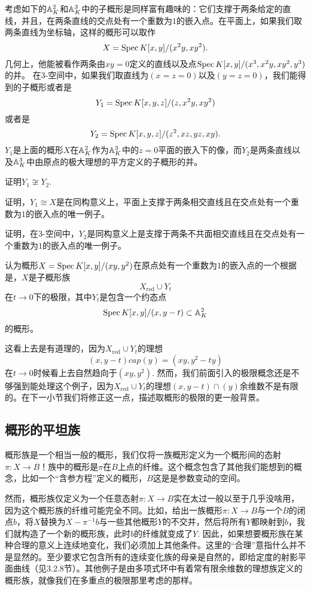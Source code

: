 考虑如下的$\mathbb{A}_K^2$和$\mathbb{A}_K^3$中的子概形是同样富有趣味的：它们支撑于两条给定的直线，并且，在两条直线的交点处有一个重数为$1$的嵌入点。在平面上，如果我们取两条直线为坐标轴，这样的概形可以取作
\[
	X=\operatorname{Spec} K[x,y]/(x^2y,xy^2).
\]
几何上，他能被看作两条由$xy=0$定义的直线以及点$\operatorname{Spec} K[x,y]/(x^3,x^2y,xy^2,y^3)$的并。 在$3$\hyp 空间中，如果我们取直线为$(x=z=0)$以及$(y=z=0)$，我们能得到的子概形或者是
\[
	Y_1=\operatorname{Spec} K[x,y,z]/(z,x^2y,xy^2)
\]
或者是
\[
	Y_2=\operatorname{Spec} K[x,y,z]/(z^2,xz,yz,xy).
\]
$Y_1$是上面的概形$X$在$\mathbb{A}_K^2$作为$\mathbb{A}_K^3$中的$z=0$平面的嵌入下的像，而$Y_2$是两条直线以及$\mathbb{A}_K^3$中由原点的极大理想的平方定义的子概形的并。

\begin{exe}
	证明$Y_1\not\cong Y_2$.
	\begin{compactenum}[(a)]
		\item 证明，$Y_1\cong X$是在同构意义上，平面上支撑于两条相交直线且在交点处有一个重数为$1$的嵌入点的唯一例子。
		\item 证明，在$3$\hyp 空间中，$Y_2$是同构意义上是支撑于两条不共面相交直线且在交点处有一个重数为$1$的嵌入点的唯一例子。
	\end{compactenum}
\end{exe}

认为概形$X=\operatorname{Spec} K[x,y]/(xy,y^2)$在原点处有一个重数为$1$的嵌入点的一个根据是，$X$是子概形族
\[
	X_{\text{red}}\cup Y_t
\]
在$t\to 0$下的极限，其中$Y_t$是包含一个约态点
\[
	\operatorname{Spec} K[x,y]/(x,y-t)\subset \mathbb{A}_K^2
\]
的概形。

这看上去是有道理的，因为$X_{\text{red}}\cup Y_t$的理想
\[
	(x,y-t)cap (y)=(xy,y^2-ty)
\]
在$t\to 0$时候看上去自然趋向于$(xy,y^2)$. 然而，我们前面引入的极限概念还是不够强到能处理这个例子，因为$X_{\text{red}}\cup Y_t$的理想$(x,y-t)\cap(y)$余维数不是有限的。在下一小节我们将修正这一点，描述取概形的极限的更一般背景。

\subsection{概形的平坦族}\label{s.2.3.4}

概形族是一个相当一般的概形，我们仅将一族概形定义为一个概形间的态射$\pi:X\to B$！族中的概形是$\pi$在$B$上点的纤维。这个概念包含了其他我们能想到的概念，比如一个“含参方程”定义的概形，$B$这是是参数变动的空间。

然而，概形族仅定义为一个任意态射$\pi:X\to B$实在太过一般以至于几乎没啥用，因为这个概形族的纤维可能完全不同。比如，给出一族概形$\pi:X\to B$与一个$B$的闭点$b$，将$X$替换为$X-\pi^{-1}b$与一些其他概形$Y$的不交并，然后将所有$Y$都映射到$b$，我们就构造了一个新的概形族，此时$b$的纤维就变成了$Y$. 因此，如果想要概形族在某种合理的意义上连续地变化，我们必须加上其他条件。这里的“合理”意指什么并不是显然的。至少要求它包含所有的连续变化族的母亲是自然的，即给定度的射影平面曲线（见3.2.8节）。其他例子是由多项式环中有着常有限余维数的理想族定义的概形族，就像我们在多重点的极限那里考虑的那样。

